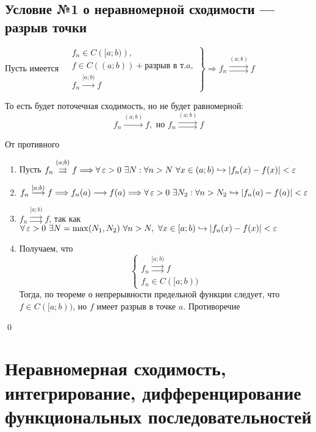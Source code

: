 \documentclass[a4paper, 10pt]{article}
\begin{document}
\subsection{Условие №1 о неравномерной сходимости — разрыв точки}
\theorem Пусть имеется $\left.\begin{aligned}
    &f_n\in C\left([a;b)\right),\\
    &f\in C((a;b))+\text{разрыв в т.}a,\\
    &f_n\overset{[a;b)}{\longrightarrow} f
\end{aligned}\right\}\Longrightarrow f_n\overset{(a;b)}{\rightrightarrows} f$

То есть будет поточечная сходимость, но не будет равномерной:
\begin{equation*}
    f_n\overset{(a;b)}{\longrightarrow}f,\text{ но }f_n\overset{(a;b)}{\rightrightarrows} f
\end{equation*}

\proof От противного

\begin{enumerate}
    \item Пусть $f_n\overset{(a;b)}{\rightrightarrows} f\Longrightarrow \forall\operatorname{\varepsilon}>0\ \exists N:\forall n>N\ \forall x\in (a;b)\hookrightarrow|f_n(x)-f(x)|<\operatorname{\varepsilon}$
    \item $f_n\overset{[a;b)}{\longrightarrow} f \Longrightarrow f_n(a)\longrightarrow f(a)\Longrightarrow\forall\operatorname{\varepsilon}>0\ \exists N_2:\forall n>N_2\hookrightarrow|f_n(a)-f(a)|<\operatorname{\varepsilon}$
    \item $f_n\overset{[a;b)}{\rightrightarrows} f$, так как $\forall\operatorname{\varepsilon}>0\ \exists N=\max(N_1,N_2)\ \forall n>N,\ \forall x\in [a;b) \hookrightarrow|f_n(x)-f(x)|<\operatorname{\varepsilon}$
    \item Получаем, что 
    \begin{equation*}
        \begin{cases}
            f_n\overset{[a;b)}{\rightrightarrows} f\\
            f_n\in C([a;b))
        \end{cases}
    \end{equation*}
    Тогда, по теореме о непрерывности предельной функции следует, что $f\in C([a;b))$, но $f$ имеет разрыв в точке $a$. Противоречие
\end{enumerate}\qed



\newpage
\section{Неравномерная сходимость, интегрирование, дифференцирование функциональных последовательностей}
\end{document}

